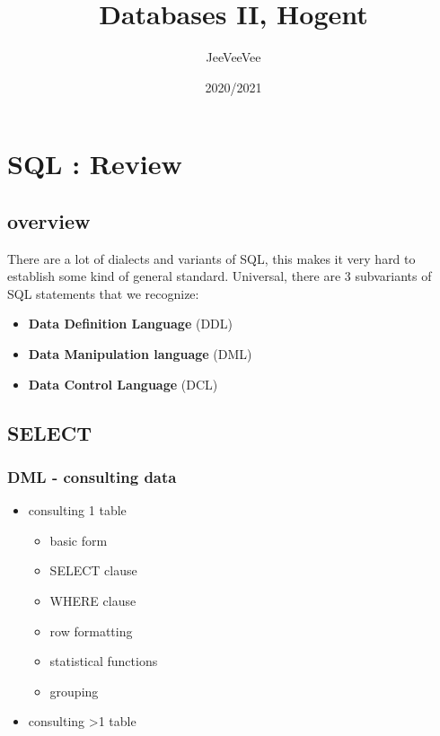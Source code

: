 \documentclass{report}
\title{Databases II, Hogent}
\author{JeeVeeVee}
\date{2020/2021}
\begin{document}
	\maketitle
	\tableofcontents
	
	\chapter{SQL : Review}
	\section{overview}
	
	There are a lot of dialects and variants of SQL, this makes it very hard to establish some kind of general standard. Universal, there are 3 subvariants of SQL statements that we recognize: 
	
	\begin{itemize}
		\item \textbf{Data Definition Language} (DDL) 
		\item \textbf{Data Manipulation language} (DML)
		\item \textbf{Data Control Language} (DCL)
	\end{itemize}
	
	\section{SELECT}
	\subsection{DML - consulting data}
	\begin{itemize}
		\item consulting 1 table
		\begin{itemize}
			\item basic form
			\item SELECT clause
			\item WHERE clause
			\item row formatting
			\item statistical functions
			\item grouping
		\end{itemize}
		\item consulting \textgreater 1 table
	\end{itemize}
	
\end{document}
